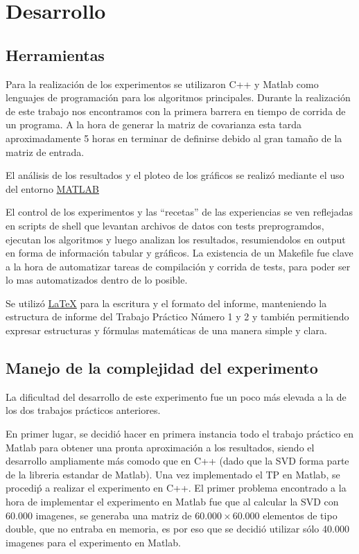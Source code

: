 \section{Desarrollo}

\subsection{Herramientas}

Para la realizaci\'on de los experimentos se utilizaron C++ y Matlab como lenguajes de
programaci\'on para los algoritmos principales. Durante la realizaci\'on de este trabajo nos encontramos con
la primera barrera en tiempo de corrida de un programa. A la hora de generar la
matriz de covarianza esta tarda aproximadamente 5 horas en terminar de definirse
debido al gran tama\~no de la matriz de entrada.

El an\'alisis de los resultados y el ploteo de los gr\'aficos se realiz\'o
mediante el uso del entorno \href{http://www.matlab.com/}{MATLAB}

El control de los experimentos y las ``recetas'' de las experiencias se ven
reflejadas en scripts de shell que levantan archivos de datos con tests
preprogramdos, ejecutan los algoritmos y luego analizan los resultados,
resumiendolos en output en forma de informaci\'on tabular y gr\'aficos.
La existencia de un Makefile fue clave a la hora de automatizar tareas de
compilaci\'on y corrida de tests, para poder ser lo mas automatizados dentro de
lo posible.

Se utiliz\'o \href{http://www.latex-project.org/}{\LaTeX} para la escritura y el formato del informe,
manteniendo la estructura de informe del Trabajo Pr\'actico N\'umero 1 y 2 y tambi\'en
permitiendo expresar estructuras y f\'ormulas matem\'aticas de una manera simple y clara.

\subsection{Manejo de la complejidad del experimento}

La dificultad del desarrollo de este experimento fue un poco m\'as elevada a la de los dos
trabajos pr\'acticos anteriores.

En primer lugar, se decidi\'o hacer en primera instancia todo el trabajo pr\'actico en Matlab para obtener
una pronta aproximaci\'on a los resultados, siendo el desarrollo ampliamente m\'as comodo que
en C++ (dado que la SVD forma parte de la libreria estandar de Matlab). Una vez implementado
el TP en Matlab, se procedi\'p a realizar el experimento en C++. El primer problema encontrado
a la hora de implementar el experimento en Matlab fue que al calcular la SVD con 60.000 imagenes,
se generaba una matriz de $60.000 \times 60.000$ elementos de tipo double, que no entraba en
memoria, es por eso que se decidi\'o utilizar s\'olo 40.000 imagenes para el experimento en Matlab.

